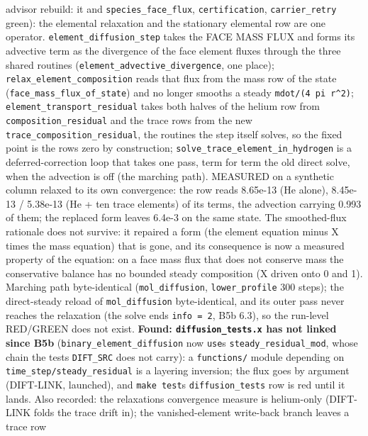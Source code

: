 \documentclass[english,a4paper]{my_memo}
\begin{document}
\begin{itemize}
  advisor rebuild: it and \texttt{species\_face\_flux}, \texttt{certification},
  \texttt{carrier\_retry} green): the elemental relaxation and the stationary
  elemental row are one operator. \texttt{element\_diffusion\_step} takes the FACE
  MASS FLUX and forms its advective term as the divergence of the face
  element fluxes through the three shared routines
  (\texttt{element\_advective\_divergence}, one place); \texttt{relax\_element\_composition}
  reads that flux from the mass row of the state (\texttt{face\_mass\_flux\_of\_state})
  and no longer smooths a steady \texttt{mdot/(4\ pi\ r\^{}2)}; \texttt{element\_transport\_residual}
  takes both halves of the helium row from \texttt{composition\_residual} and the
  trace rows from the new \texttt{trace\_composition\_residual}, the routines the step
  itself solves, so the fixed point is the row\textquotesingle s zero by construction;
  \texttt{solve\_trace\_element\_in\_hydrogen} is a deferred-correction loop that takes
  one pass, term for term the old direct solve, when the advection is off
  (the marching path). MEASURED on a synthetic column relaxed to its own
  convergence: the row reads 8.65e-13 (He alone), 8.45e-13 / 5.38e-13 (He +
  ten trace elements) of its terms, the advection carrying 0.993 of them;
  the replaced form leaves 6.4e-3 on the same state. The smoothed-flux
  rationale does not survive: it repaired a form (the element equation minus
  X times the mass equation) that is gone, and its consequence is now a
  measured property of the equation: on a face mass flux that does not
  conserve mass the conservative balance has no bounded steady composition
  (X driven onto 0 and 1). Marching path byte-identical (\texttt{mol\_diffusion},
  \texttt{lower\_profile} 300 steps); the direct-steady reload of \texttt{mol\_diffusion}
  byte-identical, and its outer pass never reaches the relaxation (the solve
  ends \texttt{info\ =\ 2}, B5b 6.3), so the run-level RED/GREEN does not exist.
  \textbf{Found: \texttt{diffusion\_tests.x} has not linked since B5b} (\texttt{binary\_element\_diffusion}
  now \texttt{use}s \texttt{steady\_residual\_mod}, whose chain the test\textquotesingle s \texttt{DIFT\_SRC} does not
  carry): a \texttt{functions/} module depending on \texttt{time\_step/steady\_residual} is a
  layering inversion; the flux goes by argument (DIFT-LINK, launched), and
  \texttt{make\ test}\textquotesingle s \texttt{diffusion\_tests} row is red until it lands. Also recorded:
  the relaxation\textquotesingle s convergence measure is helium-only (DIFT-LINK folds the
  trace drift in); the vanished-element write-back branch leaves a trace row

\end{itemize}
\end{document}
